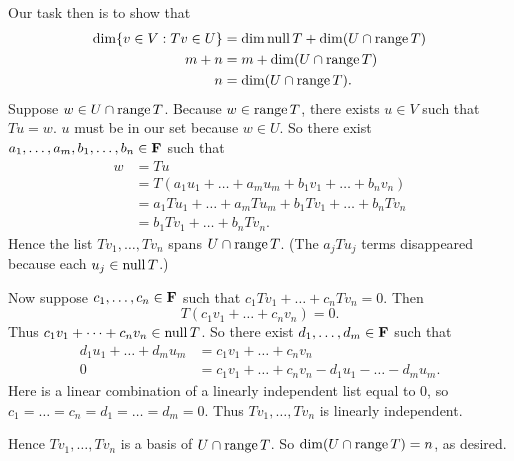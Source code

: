 \documentclass[a5paper]{article}
\begin{document}
    Our task then is to show that
\begin{align*}
        \operatorname{dim}\{v \in V : Tv \in U\} &= \operatorname{dim}\operatorname{null}T + \operatorname{dim}(U \cap \operatorname{range}T) \\
                                 m + n &= m + \operatorname{dim}(U \cap \operatorname{range}T) \\
                                     n &= \operatorname{dim}(U \cap \operatorname{range}T) .
\end{align*}
    Suppose $w \in U \cap \operatorname{range}T$.
    Because $w \in \operatorname{range}T$, there exists $u \in V$ such that $Tu = w$.
    $u$ must be in our set because $w \in U$.
    So there exist $a_1,\dots,a_m,b_1,\dots,b_n \in \mathbf{F}$ such that
\begin{align*}
         w &= Tu \\
           &= T(a_1u_1 + \dots + a_mu_m + b_1v_1 + \dots + b_nv_n) \\
           &= a_1Tu_1 + \dots + a_mTu_m + b_1Tv_1 + \dots + b_nTv_n \\
           &= b_1Tv_1 + \dots + b_nTv_n .
\end{align*}
    Hence the list $Tv_1,\dots,Tv_n$ spans $U \cap \operatorname{range}T$.
    (The $a_jTu_j$ terms disappeared because each $u_j \in \operatorname{null}T$.)

    Now suppose $c_1,\dots,c_n \in \mathbf{F}$ such that $c_1Tv_1 + \dots + c_nTv_n = 0$.
    Then
\begin{equation*}
        T(c_1v_1 + \dots + c_nv_n) = 0.
\end{equation*}
    Thus $c_1v_1+\dots+c_nv_n \in \operatorname{null}T$.
    So there exist $d_1,\dots,d_m \in \mathbf{F}$ such that
\begin{align*}
        d_1u_1 + \dots + d_mu_m &= c_1v_1 + \dots + c_nv_n \\
        0 &= c_1v_1 + \dots + c_nv_n - d_1u_1 - \dots - d_mu_m .
\end{align*}
    Here is a linear combination of a linearly independent list equal to 0, so $c_1=\dots=c_n=d_1=\dots=d_m=0$.
    Thus $Tv_1,\dots,Tv_n$ is linearly independent.

    Hence $Tv_1,\dots,Tv_n$ is a basis of $U \cap \operatorname{range}T$.
    So $\operatorname{dim}(U \cap \operatorname{range}T) = n$, as desired.
\end{document}
